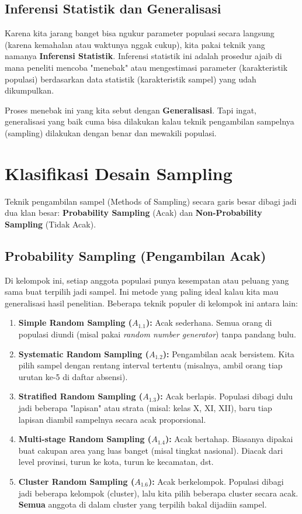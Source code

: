 \documentclass[12pt,a4paper]{article}
\begin{document}
\subsection{Inferensi Statistik dan Generalisasi}
Karena kita jarang banget bisa ngukur parameter populasi secara langsung (karena kemahalan atau waktunya nggak cukup), kita pakai teknik yang namanya \textbf{Inferensi Statistik}.
Inferensi statistik ini adalah prosedur ajaib di mana peneliti mencoba "menebak" atau mengestimasi parameter (karakteristik populasi) berdasarkan data statistik (karakteristik sampel) yang udah dikumpulkan.

Proses menebak ini yang kita sebut dengan \textbf{Generalisasi}. Tapi ingat, generalisasi yang baik cuma bisa dilakukan kalau teknik pengambilan sampelnya (sampling) dilakukan dengan benar dan mewakili populasi.

\newpage
\section{Klasifikasi Desain Sampling}

Teknik pengambilan sampel (Methods of Sampling) secara garis besar dibagi jadi dua klan besar: \textbf{Probability Sampling} (Acak) dan \textbf{Non-Probability Sampling} (Tidak Acak).

\subsection{Probability Sampling (Pengambilan Acak)}
Di kelompok ini, setiap anggota populasi punya kesempatan atau peluang yang sama buat terpilih jadi sampel. Ini metode yang paling ideal kalau kita mau generalisasi hasil penelitian. Beberapa teknik populer di kelompok ini antara lain:
\begin{enumerate}
    \item \textbf{Simple Random Sampling ($A_{1.1}$):} Acak sederhana. Semua orang di populasi diundi (misal pakai \textit{random number generator}) tanpa pandang bulu.
    \item \textbf{Systematic Random Sampling ($A_{1.2}$):} Pengambilan acak bersistem. Kita pilih sampel dengan rentang interval tertentu (misalnya, ambil orang tiap urutan ke-5 di daftar absensi).
    \item \textbf{Stratified Random Sampling ($A_{1.3}$):} Acak berlapis. Populasi dibagi dulu jadi beberapa "lapisan" atau strata (misal: kelas X, XI, XII), baru tiap lapisan diambil sampelnya secara acak proporsional.
    \item \textbf{Multi-stage Random Sampling ($A_{1.4}$):} Acak bertahap. Biasanya dipakai buat cakupan area yang luas banget (misal tingkat nasional). Diacak dari level provinsi, turun ke kota, turun ke kecamatan, dst.
    \item \textbf{Cluster Random Sampling ($A_{1.6}$):} Acak berkelompok. Populasi dibagi jadi beberapa kelompok (cluster), lalu kita pilih beberapa cluster secara acak. \textbf{Semua} anggota di dalam cluster yang terpilih bakal dijadiin sampel.
\end{enumerate}
\end{document}
